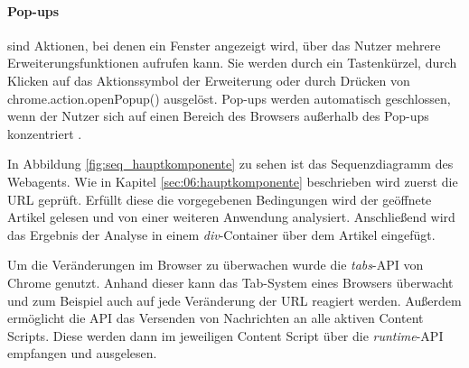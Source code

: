 \paragraph{Pop-ups} sind Aktionen, bei denen ein Fenster angezeigt wird, über das Nutzer mehrere Erweiterungsfunktionen aufrufen kann. 
Sie werden durch ein Tastenkürzel, durch Klicken auf das Aktionssymbol der Erweiterung oder durch Drücken von chrome.action.openPopup() ausgelöst. 
Pop-ups werden automatisch geschlossen, wenn der Nutzer sich auf einen Bereich des Browsers außerhalb des Pop-ups konzentriert \cite{chrome2025popups}.

In Abbildung \ref{fig:seq_hauptkomponente} zu sehen ist das Sequenzdiagramm des Webagents. Wie in Kapitel \ref{sec:06:hauptkomponente} beschrieben
wird zuerst die URL geprüft. Erfüllt diese die vorgegebenen Bedingungen wird der geöffnete Artikel gelesen und von einer weiteren Anwendung
analysiert. Anschließend wird das Ergebnis der Analyse in einem \textit{div}-Container über dem Artikel eingefügt.

Um die Veränderungen im Browser zu überwachen wurde die \textit{tabs}-API von Chrome genutzt. Anhand dieser kann das Tab-System eines Browsers überwacht
und zum Beispiel auch auf jede Veränderung der URL reagiert werden.
Außerdem ermöglicht die API das Versenden von Nachrichten an alle aktiven Content Scripts. Diese werden dann im jeweiligen Content Script über die
\textit{runtime}-API empfangen und ausgelesen.


